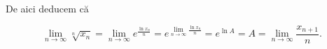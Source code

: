 \documentclass[a4paper,12pt,oneside]{report}
\begin{document}
De aici deducem că 

\begin{displaymath}
  \lim_{n \to \infty }\sqrt[n]{x_{n}} = \lim_{n \to \infty } e^{\frac{\ln x_{n}}{n}} = e^{\lim_{n \to \infty } \frac{\ln x_{n}}{n}} = e^{\ln A} = A = \lim_{n \to \infty}\frac{x_{n+1}}{n}.
\end{displaymath}










\setlength{\baselineskip}{\normalbaselineskip}
\setlength{\parskip}{0pt}

\end{document}
